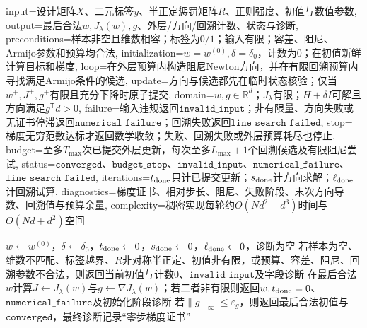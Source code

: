 \begin{AlgorithmContract}{
  input={设计矩阵$X$、二元标签$y$、半正定惩罚矩阵$R$、正则强度、初值与数值参数},
  output={最后合法$w,J_\lambda(w),g$、外层/方向/回溯计数、状态与诊断},
  preconditions={样本非空且维数相容；标签为$0/1$；输入有限；容差、阻尼、Armijo参数和预算均合法},
  initialization={$w=w^{(0)},\delta=\delta_0$，计数为$0$；在初值新鲜计算目标和梯度},
  loop={在外层预算内构造阻尼Newton方向，并在有限回溯预算内寻找满足Armijo条件的候选},
  update={方向与候选都先在临时状态核验；仅当$w^+,J^+,g^+$有限且充分下降时原子提交},
  domain={$w,g\in\mathbb R^d$；$J_\lambda$有限；$H+\delta I$可解且方向满足$g^{\mathsf T}d>0$},
  failure={输入违规返回$\mathtt{invalid\_input}$；非有限量、方向失败或无证书停滞返回$\mathtt{numerical\_failure}$；回溯失败返回$\mathtt{line\_search\_failed}$},
  stop={梯度无穷范数达标才返回数学收敛；失败、回溯失败或外层预算耗尽也停止},
  budget={至多$T_{\max}$次已提交外层更新，每次至多$L_{\max}+1$个回溯候选及有限阻尼尝试},
  status={$\mathtt{converged}$、$\mathtt{budget\_stop}$、$\mathtt{invalid\_input}$、$\mathtt{numerical\_failure}$、$\mathtt{line\_search\_failed}$},
  iterations={$t_{\rm done}$只计已提交更新；$s_{\rm done}$计方向求解；$\ell_{\rm done}$计回溯试算},
  diagnostics={梯度证书、相对步长、阻尼、失败阶段、末次方向导数、回溯值与预算余量},
  complexity={稠密实现每轮约$O(Nd^2+d^3)$时间与$O(Nd+d^2)$空间}
}
\begin{algorithm}[H]
\caption{带回溯线搜索的阻尼Newton逻辑斯谛回归}\label{alg:V2-C05-newton}
$w\leftarrow w^{(0)}$，$\delta\leftarrow\delta_0$，$t_{\rm done}\leftarrow0$，$s_{\rm done}\leftarrow0$，$\ell_{\rm done}\leftarrow0$，诊断为空\;
若样本为空、维数不匹配、标签越界、$R$非对称半正定、初值非有限，或预算、容差、阻尼、回溯参数不合法，则返回当前初值与计数$0$、$\mathtt{invalid\_input}$及字段诊断\;
在最后合法$w$计算$J\leftarrow J_\lambda(w)$与$g\leftarrow\nabla J_\lambda(w)$；若二者非有限则返回$w,t_{\rm done}=0$、$\mathtt{numerical\_failure}$及初始化阶段诊断\;
若$\lVert g\rVert_\infty\le\varepsilon_g$，则返回最后合法初值与$\mathtt{converged}$，最终诊断记录“零步梯度证书”\;
\end{algorithm}
\end{AlgorithmContract}
